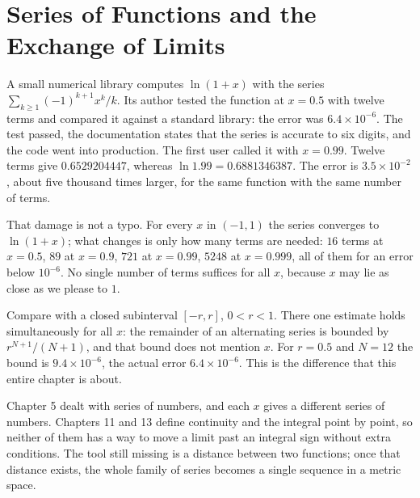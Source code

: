 \chapter{Series of Functions and the Exchange of Limits}

A small numerical library computes $\ln(1+x)$ with the series
$\sum_{k\ge 1}(-1)^{k+1}x^{k}/k$. Its author tested the function at $x=0.5$
with twelve terms and compared it against a standard library: the error was
$6.4\times 10^{-6}$. The test passed, the documentation states that the series is
accurate to six digits, and the code went into production. The first user called it with
$x=0.99$. Twelve terms give $0.6529204447$, whereas
$\ln 1.99=0.6881346387$. The error is $3.5\times10^{-2}$, about five thousand times
larger, for the same function with the same number of terms.

That damage is not a typo. For every $x$ in $(-1,1)$ the series converges
to $\ln(1+x)$; what changes is only how many terms are needed: $16$
terms at $x=0.5$, $89$ at $x=0.9$, $721$ at $x=0.99$, $5248$ at $x=0.999$,
all of them for an error below $10^{-6}$. No single number of terms suffices
for all $x$, because $x$ may lie as close as we please to $1$.

Compare with a closed subinterval $[-r,r]$, $0<r<1$. There one estimate
holds simultaneously for all $x$: the remainder of an alternating series is bounded by
$r^{N+1}/(N+1)$, and that bound does not mention $x$. For $r=0.5$ and $N=12$
the bound is $9.4\times10^{-6}$, the actual error $6.4\times10^{-6}$. This is the
difference that this entire chapter is about.

Chapter 5 dealt with series of numbers, and each $x$ gives a different series of
numbers. Chapters 11 and 13 define continuity and the integral point by point,
so neither of them has a way to move a limit past an integral sign without
extra conditions. The tool still missing is a distance between two functions; once that
distance exists, the whole family of series becomes a single sequence in a metric space.


